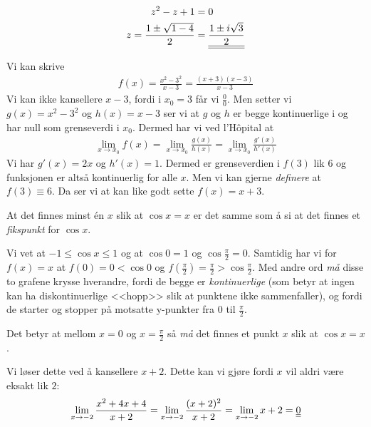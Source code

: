 \documentclass[a4paper,norsk,12pt]{article}
\begin{document}
\begin{equation*}
\begin{split}
  z^2 - z + 1 & = 0 \\
  z = \frac{1 \pm \sqrt{1-4}}{2}
  & = {\underline{\underline{\frac{1 \pm i\sqrt{3}}{2}}}}
\end{split}
\end{equation*}

Vi kan skrive
\begin{equation*}
\begin{split}
  f(x) = \frac{x^2-3^2}{x-3} = \frac{(x+3)(x-3)}{x-3}
\end{split}
\end{equation*}
Vi kan ikke kansellere $x-3$, fordi i $x_0=3$ får vi
$\frac{0}{0}$. Men setter vi $g(x)=x^2-3^2$ og $h(x)=x-3$ ser vi at $g$ og $h$
er begge kontinuerlige i og har null som grenseverdi i $x_0$. Dermed har vi ved
l'Hôpital at
\begin{equation*}
\begin{split}
  \lim_{x\to x_0}{f(x)} =
  \lim_{x\to x_0}{\frac{g(x)}{h(x)}} =
  \lim_{x\to x_0}{\frac{g'(x)}{h'(x)}}
\end{split}
\end{equation*}
Vi har $g'(x) = 2x$ og $h'(x) = 1$. Dermed er grenseverdien i $f(3)$ lik $6$ og
funksjonen er altså kontinuerlig for alle $x$. Men vi kan gjerne
\textit{definere} at $f(3) \equiv 6$. Da ser vi at kan like godt sette $f(x) =
x+3$.



At det finnes minst én $x$ slik at $\cos{x}=x$ er det samme som å si at det
finnes et \textit{fikspunkt} for $\cos{x}$.

Vi vet at $-1 \leq \cos{x} \leq 1$ og at $\cos{0} = 1$ og $\cos{\frac{\pi}{2}}
= 0$. Samtidig har vi for $f(x)=x$ at $f(0) = 0 < \cos{0}$ og $f(\frac{\pi}{2})
= \frac{\pi}{2} > \cos{\frac{\pi}{2}}$. Med andre ord \textit{må} disse to
grafene krysse hverandre, fordi de begge er \textit{kontinuerlige} (som betyr
at ingen kan ha diskontinuerlige <<hopp>> slik at punktene ikke sammenfaller),
og fordi de starter og stopper på motsatte y-punkter fra $0$ til
$\frac{\pi}{2}$.

Det betyr at mellom $x=0$ og $x=\frac{\pi}{2}$ så \textit{må} det finnes et punkt $x$
slik at $\cos{x} = x$.


Vi løser dette ved å kansellere $x+2$. Dette kan vi gjøre
fordi $x$ vil aldri være eksakt lik $2$:
\begin{equation*}
\begin{split}
  \lim_{x \to -2}{\frac{x^2+4x+4}{x+2}} = \lim_{x \to -2}{\frac{(x+2)^2}{x+2}}
  = \lim_{x \to -2}{x+2} = {\underline{\underline{0}}}
\end{split}
\end{equation*}
\end{document}
